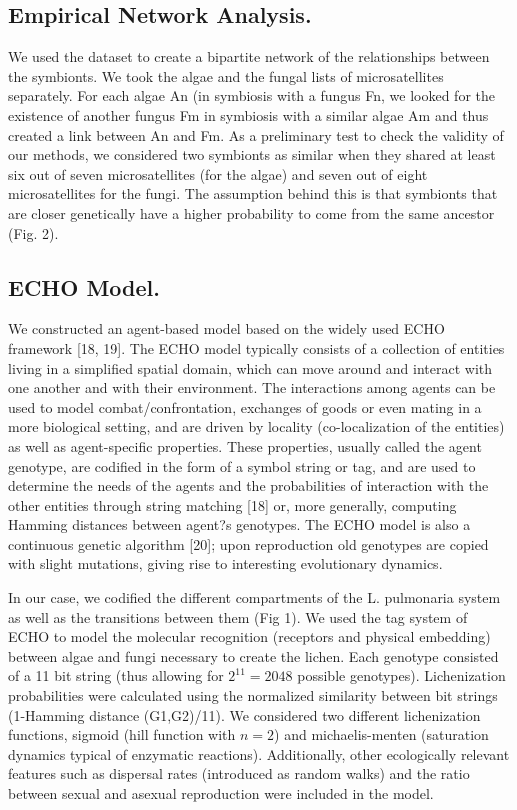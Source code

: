
\subsection{Empirical Network Analysis.}

We  used the \cite{dalgrande2012verticalandhorizontalphotobionttransmissionwithinpopulationsofalichensymbiosis} dataset to create a bipartite network of the relationships between the symbionts. We took the algae and the fungal lists of microsatellites separately. For each algae An (in symbiosis with a fungus Fn, we looked for the existence of another fungus Fm in symbiosis with a similar algae Am and thus created a link between An and Fm. As a preliminary test to check the validity of our methods, we considered two symbionts as similar when they shared at least six out of seven microsatellites (for the algae) and seven out of eight microsatellites for the fungi. The assumption behind this is that symbionts that are closer genetically have a higher probability to come from the same ancestor (Fig. 2). 


\subsection{ECHO Model.}

We constructed an agent-based model based on the widely used ECHO framework [18, 19]. The ECHO model typically consists of a collection of entities living in a simplified spatial domain, which can move around and interact with one another and with their environment. The interactions among agents can be used to model combat/confrontation, exchanges of goods or even mating in a more biological setting, and are driven by locality (co-localization of the entities) as well as agent-specific properties. These properties, usually called the agent genotype, are codified in the form of a symbol string or tag, and are used to determine the needs of the agents and the probabilities of interaction with the other entities through string matching [18] or, more generally, computing Hamming distances between agent?s genotypes. The ECHO model is also a continuous genetic algorithm  [20]; upon reproduction old genotypes are copied with slight mutations, giving rise to interesting evolutionary dynamics.

 In our case, we codified the different compartments of the L. pulmonaria system as well as the transitions between them (Fig 1). We used the tag system of ECHO to model the molecular recognition (receptors and physical embedding) between algae and fungi necessary to create the lichen. Each genotype consisted of a 11 bit string (thus allowing for $2^11=2048$ possible genotypes). Lichenization probabilities were calculated using the normalized similarity between bit strings (1-Hamming distance (G1,G2)/11). We considered two different lichenization functions, sigmoid (hill function with $n=2$) and michaelis-menten (saturation dynamics typical of enzymatic reactions). Additionally, other ecologically relevant features such as dispersal rates (introduced as random walks) and the ratio between sexual and asexual reproduction were included in the model. 
 
